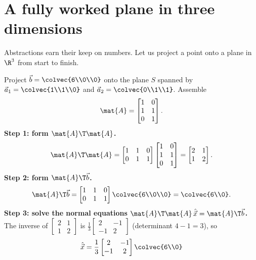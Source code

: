 \section{A fully worked plane in three dimensions}

Abstractions earn their keep on numbers. Let us project a point onto a plane in $\R^3$ from start
to finish.

\begin{example}\label{ch18:plane-worked}
Project $\vec{b}=\colvec{6\\0\\0}$ onto the plane $S$ spanned by
$\vec{a}_1=\colvec{1\\1\\0}$ and $\vec{a}_2=\colvec{0\\1\\1}$. Assemble
\[
  \mat{A} = \begin{bmatrix} 1 & 0 \\ 1 & 1 \\ 0 & 1 \end{bmatrix}.
\]
\textbf{Step 1: form $\mat{A}\T\mat{A}$.}
\[
  \mat{A}\T\mat{A}
  = \begin{bmatrix} 1 & 1 & 0 \\ 0 & 1 & 1 \end{bmatrix}
    \begin{bmatrix} 1 & 0 \\ 1 & 1 \\ 0 & 1 \end{bmatrix}
  = \begin{bmatrix} 2 & 1 \\ 1 & 2 \end{bmatrix}.
\]
\textbf{Step 2: form $\mat{A}\T\vec{b}$.}
\[
  \mat{A}\T\vec{b}
  = \begin{bmatrix} 1 & 1 & 0 \\ 0 & 1 & 1 \end{bmatrix}\colvec{6\\0\\0}
  = \colvec{6\\0}.
\]
\textbf{Step 3: solve the normal equations $\mat{A}\T\mat{A}\,\hat{\vec{x}}=\mat{A}\T\vec{b}$.}
The inverse of $\begin{bmatrix}2&1\\1&2\end{bmatrix}$ is
$\frac{1}{3}\begin{bmatrix}2&-1\\-1&2\end{bmatrix}$ (determinant $4-1=3$), so
\[
  \hat{\vec{x}} = \frac{1}{3}\begin{bmatrix}2&-1\\-1&2\end{bmatrix}\colvec{6\\0}
\]
\end{example}
